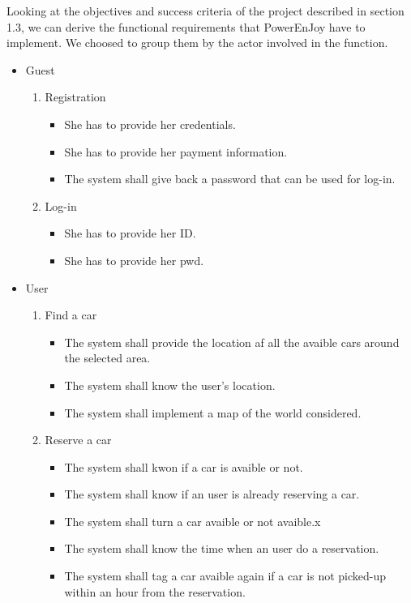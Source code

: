 Looking at the objectives and success criteria of the project described in section 1.3, we can derive the functional requirements that PowerEnJoy have to implement. We choosed to group them by the actor involved in the function.
\begin{itemize}
\item Guest
\begin{enumerate}
	\item Registration
	\begin{itemize}
	\item She has to provide her credentials. 
	\item She has to provide her payment information.
	\item The system shall give back a password that can be used for log-in.

	\end{itemize}
	\item Log-in
	\begin{itemize}
	\item She has to provide her \gls{ID}.
	\item She has to provide her \gls{pwd}.

	\end{itemize}
	
	\end{enumerate}
\item User
\begin{enumerate}
	
	\item Find a car
	\begin{itemize}
	\item The system shall provide the location af all the avaible cars around the selected area.
	\item The system shall know the user's location.
	\item The system shall implement a map of the world considered.
	\end{itemize}
	
	\item Reserve a car
	\begin{itemize}
	\item The system shall kwon if a car is avaible or not.
	\item The system shall know if an user is already reserving a car.
	\item The system shall turn a car avaible or not avaible.x
	\item The system shall know the time when an user do a reservation.
	\item The system shall tag a car avaible again if a car is not picked-up within an hour from the reservation.
	\end{itemize}
	

\end{enumerate}
\end{itemize}
